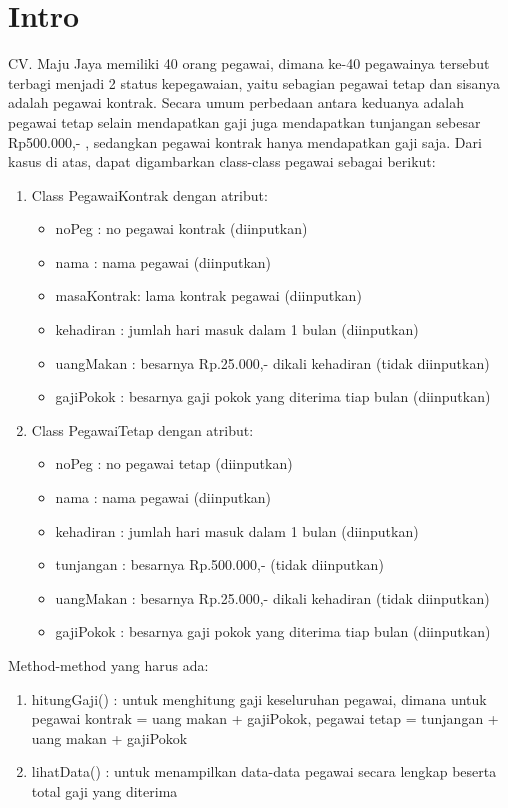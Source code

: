 \documentclass[11pt]{article}
\date{\today}
\title{}
\begin{document}
\tableofcontents

\section{Intro}
\label{sec:org3b58515}
CV. Maju Jaya memiliki 40 orang pegawai, dimana ke-40 pegawainya tersebut terbagi menjadi 2 status kepegawaian,
yaitu sebagian pegawai tetap dan sisanya adalah pegawai kontrak.
Secara umum perbedaan antara keduanya adalah pegawai tetap selain mendapatkan gaji juga mendapatkan tunjangan sebesar Rp500.000,- ,
sedangkan pegawai kontrak hanya mendapatkan gaji saja.
Dari kasus di atas, dapat digambarkan class-class pegawai sebagai berikut:
\begin{enumerate}
\item Class PegawaiKontrak dengan atribut:
\begin{itemize}
\item noPeg	: no pegawai kontrak (diinputkan)
\item nama	: nama pegawai (diinputkan)
\item masaKontrak: lama kontrak pegawai (diinputkan)
\item kehadiran	: jumlah hari masuk dalam 1 bulan (diinputkan)
\item uangMakan	: besarnya Rp.25.000,- dikali kehadiran (tidak diinputkan)
\item gajiPokok	: besarnya gaji pokok yang diterima tiap bulan (diinputkan)
\end{itemize}
\item Class PegawaiTetap dengan atribut:
\begin{itemize}
\item noPeg	: no pegawai tetap (diinputkan)
\item nama	: nama pegawai (diinputkan)
\item kehadiran	: jumlah hari masuk dalam 1 bulan (diinputkan)
\item tunjangan	: besarnya Rp.500.000,- (tidak diinputkan)
\item uangMakan	: besarnya Rp.25.000,- dikali kehadiran (tidak diinputkan)
\item gajiPokok	: besarnya gaji pokok yang diterima tiap bulan (diinputkan)
\end{itemize}
\end{enumerate}
Method-method yang harus ada:
\begin{enumerate}
\item hitungGaji()	: untuk menghitung gaji keseluruhan pegawai, dimana untuk pegawai kontrak = uang makan + gajiPokok, pegawai tetap = tunjangan + uang makan + gajiPokok

\item lihatData()	: untuk menampilkan data-data pegawai secara lengkap beserta total gaji yang diterima
\end{enumerate}
\end{document}
